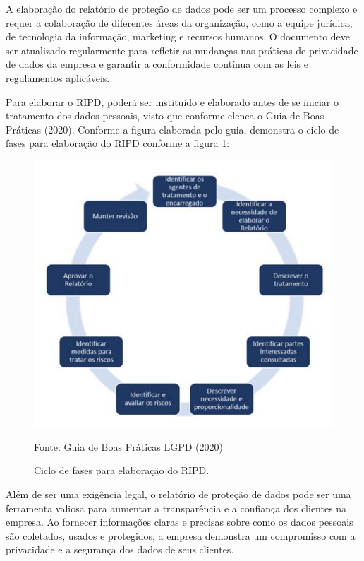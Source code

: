 \documentclass[
	12pt,				%
	openright,			%
	oneside,			%
	a4paper,			%
	english,			%
	french,				%
	spanish,			%
	brazil,				%
	]{abntex2}
\begin{document}
A elaboração do relatório de proteção de dados pode ser um processo complexo e requer a colaboração de diferentes áreas da organização, como a equipe jurídica, de tecnologia da informação, marketing e recursos humanos. O documento deve ser atualizado regularmente para refletir as mudanças nas práticas de privacidade de dados da empresa e garantir a conformidade contínua com as leis e regulamentos aplicáveis.





Para elaborar o RIPD, poderá ser instituído e elaborado antes de se iniciar o tratamento dos dados pessoais, visto que conforme elenca o Guia de Boas Práticas (2020). 
Conforme a figura elaborada pelo guia, demonstra o ciclo de fases para elaboração do RIPD conforme a figura \ref{fig: CicloRIPD }:
\begin{figure}[ht]
    \centering
    \caption{Ciclo de fases para elaboração do RIPD.}
    \includegraphics[width=4.8in]{Images/07CicloRIPD.png}
    \label{fig: CicloRIPD }
    
    \centering \small Fonte: Guia de Boas Práticas LGPD (2020)
\end{figure}

Além de ser uma exigência legal, o relatório de proteção de dados pode ser uma ferramenta valiosa para aumentar a transparência e a confiança dos clientes na empresa. Ao fornecer informações claras e precisas sobre como os dados pessoais são coletados, usados e protegidos, a empresa demonstra um compromisso com a privacidade e a segurança dos dados de seus clientes.
\end{document}
